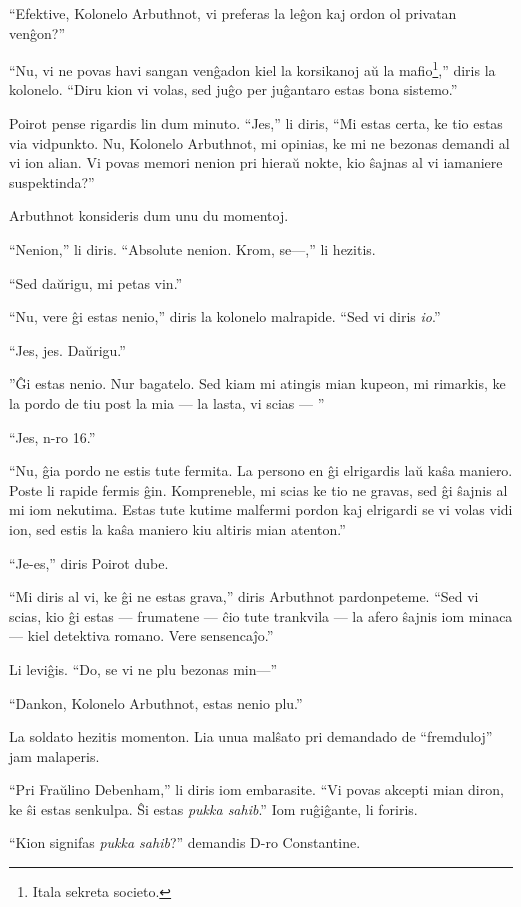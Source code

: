 ``Efektive, Kolonelo Arbuthnot, vi preferas la leĝon kaj ordon ol privatan venĝon?''

``Nu, vi ne povas havi sangan venĝadon kiel la korsikanoj aŭ la mafio\footnote{Itala sekreta societo.},'' diris la kolonelo. ``Diru kion vi volas, sed juĝo per juĝantaro estas bona sistemo.''

Poirot pense rigardis lin dum minuto. ``Jes,'' li diris, ``Mi estas certa, ke tio estas via vidpunkto. Nu, Kolonelo Arbuthnot, mi opinias, ke mi ne bezonas demandi al vi ion alian. Vi povas memori nenion pri hieraŭ nokte, kio ŝajnas al vi iamaniere suspektinda?''

Arbuthnot konsideris dum unu du momentoj.

``Nenion,'' li diris. ``Absolute nenion. Krom, se---,'' li hezitis.

``Sed daŭrigu, mi petas vin.''

``Nu, vere ĝi estas nenio,'' diris la kolonelo malrapide. ``Sed vi diris \emph{io}.''

``Jes, jes. Daŭrigu.''

''Ĝi estas nenio. Nur bagatelo. Sed kiam mi atingis mian kupeon, mi rimarkis, ke la pordo de tiu post la mia --- la lasta, vi scias --- ''

``Jes, n-ro 16.''

``Nu, ĝia pordo ne estis tute fermita. La persono en ĝi elrigardis laŭ kaŝa maniero. Poste li rapide fermis ĝin. Kompreneble, mi scias ke tio ne gravas, sed ĝi ŝajnis al mi iom nekutima. Estas tute kutime malfermi pordon kaj elrigardi se vi volas vidi ion, sed estis la kaŝa maniero kiu altiris mian atenton.''

``Je-es,'' diris Poirot dube.

``Mi diris al vi, ke ĝi ne estas grava,'' diris Arbuthnot pardonpeteme. ``Sed vi scias, kio ĝi estas --- frumatene --- ĉio tute trankvila --- la afero ŝajnis iom minaca --- kiel detektiva romano. Vere sensencaĵo.''

Li leviĝis. ``Do, se vi ne plu bezonas min---''

``Dankon, Kolonelo Arbuthnot, estas nenio plu.''

La soldato hezitis momenton. Lia unua malŝato pri demandado de ``fremduloj'' jam malaperis.

``Pri Fraŭlino Debenham,'' li diris iom embarasite. ``Vi povas akcepti mian diron, ke ŝi estas senkulpa. Ŝi estas \emph{pukka sahib}.'' Iom ruĝiĝante, li foriris.

``Kion signifas \emph{pukka sahib}?'' demandis D-ro Constantine.

